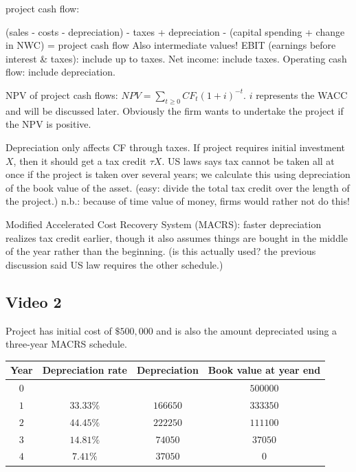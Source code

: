 \documentclass[12pt, letterpaper, parskip = full]{article}
\begin{document}
    project cash flow:

    (sales - costs - depreciation) - taxes + depreciation - (capital spending + change in NWC) = project cash flow
    Also intermediate values! EBIT (earnings before interest \& taxes): include up to taxes. Net income: include taxes. Operating cash flow: include depreciation.

    NPV of project cash flows: \(NPV = \sum_{t \geq 0} CF_t (1+i)^{-t}\). \(i\) represents the WACC and will be discussed later. Obviously the firm wants to undertake the project if the NPV is positive.

    Depreciation only affects CF through taxes. If project requires initial investment \(X\), then it should get a tax credit \(\tau X\). US laws says tax cannot be taken all at once if the project is taken over several years; we calculate this using depreciation of the book value of the asset. (easy: divide the total tax credit over the length of the project.) n.b.: because of time value of money, firms would rather not do this!

    Modified Accelerated Cost Recovery System (MACRS): faster depreciation realizes tax credit earlier, though it also assumes things are bought in the middle of the year rather than the beginning. (is this actually used? the previous discussion said US law requires the other schedule.)

    \subsection{Video 2}

    Project has initial cost of \(\$500,000\) and is also the amount depreciated using a three-year MACRS schedule. 

    \begin{center}
	\begin{tabular}{|c|c|c|c|}
		\hline
		Year & Depreciation rate & Depreciation & Book value at year end \\
		\hline
		\(0\) &  &  & \(500000\) \\
        \hline
        \(1\) & \(33.33\%\) & \(166650\) & \(333350\) \\
		\hline
        \(2\) & \(44.45\%\) & \(222250\) & \(111100\) \\
        \hline
        \(3\) & \(14.81\%\) & \(74050\) & \(37050\) \\
        \hline
        \(4\) & \(7.41\%\) & \(37050\) & \(0\) \\
        \hline
	\end{tabular}
	\end{center}
\end{document}
